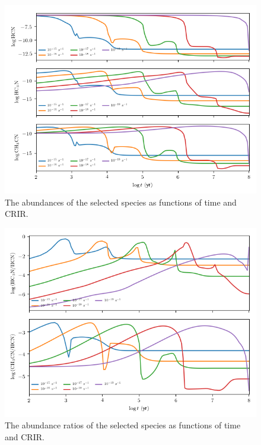 \documentclass[11pt]{article}
\newenvironment{tight_enumerate}{
    \begin{enumerate}[label=(\alph*)]
    \setlength{\itemsep}{3pt}
    \setlength{\parskip}{0pt}}
    {\end{enumerate}}
\begin{document}
\begin{tight_enumerate}
\begin{figure}[H]
\centering
\includegraphics[height=0.45\textheight]{c/abundances.png}
\caption{The abundances of the selected species as functions of time and CRIR.}
\end{figure}
\begin{figure}[H]
\centering
\includegraphics[height=0.45\textheight]{c/ratios.png}
\caption{The abundance ratios of the selected species as functions of time and CRIR.}
\end{figure}


\end{tight_enumerate}
\end{document}
